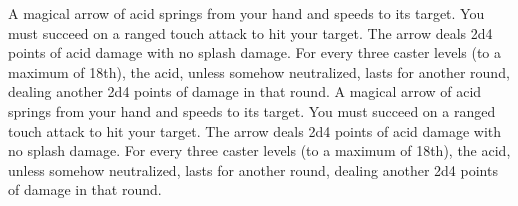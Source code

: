 \spellstart
{}
\spellend

A magical arrow of acid springs from your hand and speeds to its target. You must succeed on a ranged touch attack to hit your target. The arrow deals 2d4 points of acid damage with no splash damage. For every three caster levels (to a maximum of 18th), the acid, unless somehow neutralized, lasts for another round, dealing another 2d4 points of damage in that round.
A magical arrow of acid springs from your hand and speeds to its target. You must succeed on a ranged touch attack to hit your target. The arrow deals 2d4 points of acid damage with no splash damage. For every three caster levels (to a maximum of 18th), the acid, unless somehow neutralized, lasts for another round, dealing another 2d4 points of damage in that round.


